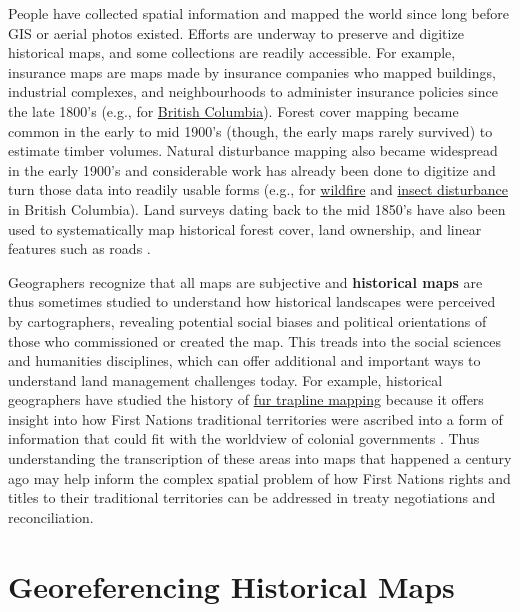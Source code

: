 \documentclass[
]{book}
\begin{document}
People have collected spatial information and mapped the world since long before GIS or aerial photos existed. Efforts are underway to preserve and digitize historical maps, and some collections are readily accessible. For example, insurance maps are maps made by insurance companies who mapped buildings, industrial complexes, and neighbourhoods to administer insurance policies since the late 1800's (e.g., for \href{https://guides.library.ubc.ca/c.php?g=699984\&p=4977440}{British Columbia}). Forest cover mapping became common in the early to mid 1900's (though, the early maps rarely survived) to estimate timber volumes. Natural disturbance mapping also became widespread in the early 1900's and considerable work has already been done to digitize and turn those data into readily usable forms (e.g., for \href{https://catalogue.data.gov.bc.ca/dataset/fire-perimeters-historical}{wildfire} and \href{https://catalogue.data.gov.bc.ca/dataset/pest-infestation-polygons-historic}{insect disturbance} in British Columbia). Land surveys dating back to the mid 1850's have also been used to systematically map historical forest cover, land ownership, and linear features such as roads \citep{tomscha_guide_2016}.

Geographers recognize that all maps are subjective and \textbf{historical maps} are thus sometimes studied to understand how historical landscapes were perceived by cartographers, revealing potential social biases and political orientations of those who commissioned or created the map. This treads into the social sciences and humanities disciplines, which can offer additional and important ways to understand land management challenges today. For example, historical geographers have studied the history of \href{https://catalogue.data.gov.bc.ca/dataset/traplines-of-british-columbia}{fur trapline mapping} because it offers insight into how First Nations traditional territories were ascribed into a form of information that could fit with the worldview of colonial governments \citep{iceton_many_2019}. Thus understanding the transcription of these areas into maps that happened a century ago may help inform the complex spatial problem of how First Nations rights and titles to their traditional territories can be addressed in treaty negotiations and reconciliation.

\hypertarget{georeferencing-historical-maps}{%
\section{Georeferencing Historical Maps}\label{georeferencing-historical-maps}}
\end{document}
